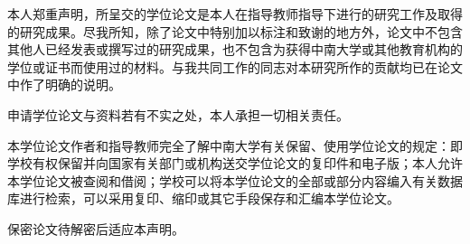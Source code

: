 \newpage

\parbox{\textwidth}{}


\vspace{1cm}
\noindent{}

\vspace{0.5cm}

{本人郑重声明，所呈交的学位论文是本人在指导教师指导下进行的研究工作及取得的研究成果。尽我所知，除了论文中特别加以标注和致谢的地方外，论文中不包含其他人已经发表或撰写过的研究成果，也不包含为获得中南大学或其他教育机构的学位或证书而使用过的材料。与我共同工作的同志对本研究所作的贡献均已在论文中作了明确的说明。

申请学位论文与资料若有不实之处，本人承担一切相关责任。}

\vspace{1cm}
\noindent\parbox{\textwidth}{
	}


\vspace{2cm}
\noindent{}

\vspace{0.5cm}

{本学位论文作者和指导教师完全了解中南大学有关保留、使用学位论文的规定：即学校有权保留并向国家有关部门或机构送交学位论文的复印件和电子版；本人允许本学位论文被查阅和借阅；学校可以将本学位论文的全部或部分内容编入有关数据库进行检索，可以采用复印、缩印或其它手段保存和汇编本学位论文。
	
	保密论文待解密后适应本声明。}

\vspace{1cm}
\noindent\parbox{\textwidth}{
	
}
\cleardoublepage
